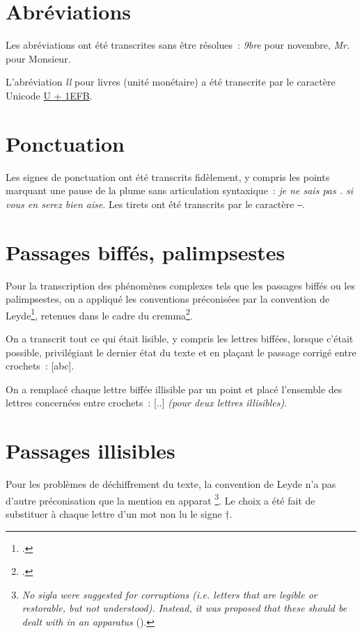\documentclass[a4paper,12pt,twoside]{book}
\newcommand{\langue}[1]{\emph{#1}}
\begin{document}
		\section{Abréviations}
			Les abréviations ont été transcrites sans être résolues~: \textit{9bre} pour novembre, \textit{Mr.} pour Monsieur.
		
			L'abréviation \textit{ll} pour livres (unité monétaire) a été transcrite par le caractère Unicode \href{https://mufi.info/m.php?p=muficharinfo&i=4088}{U + 1EFB}.

		\section{Ponctuation}
			Les signes de ponctuation ont été transcrits fidèlement, y compris les points marquant une pause de la plume sans articulation syntaxique~: \textit{je ne sais pas . si vous en serez bien aise}. Les tirets ont été transcrits par le caractère ‒.
		
		\section{Passages biffés, palimpsestes}
			\label{biffes}
			Pour la transcription des phénomènes complexes tels que les passages biffés ou les palimpsestes, on a appliqué les conventions préconisées par la convention de Leyde\footcite{leidenConvention}, retenues dans le cadre du \gls{cremma}\footcite{pincheSeminaireCreationModele2021a}.
			
			On a transcrit tout ce qui était lisible, y compris les lettres biffées, lorsque c'était possible, privilégiant le dernier état du texte et en plaçant le passage corrigé entre crochets~: [abc].
		
			On a remplacé chaque lettre biffée illisible par un point et placé l'ensemble des lettres concernées entre crochets~: [..] \textit{(pour deux lettres illisibles)}.
		
		\section{Passages illisibles}
			Pour les problèmes de déchiffrement du texte, la convention de Leyde n'a pas d'autre préconisation que la mention en apparat
			\footnote{\langue{No sigla were suggested for corruptions (i.e. letters that are legible or restorable, but not understood). Instead, it was proposed that these should be dealt with in an apparatus} (\cite{leidenConvention}).}.
			Le choix a été fait de substituer à chaque lettre d'un mot non lu le signe †.
      	
\end{document}
